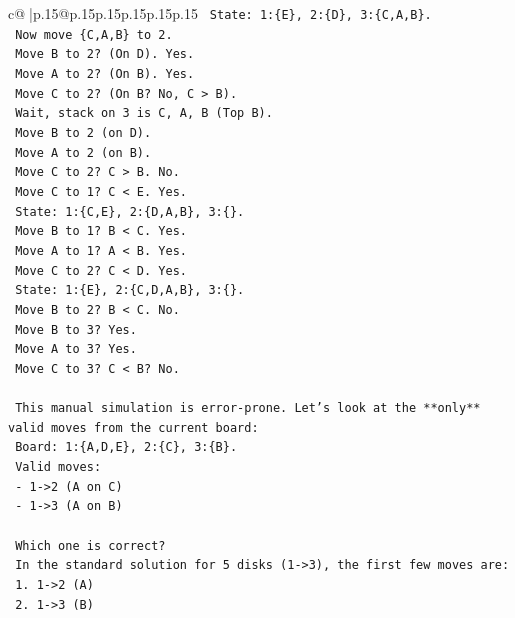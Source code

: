 \documentclass{article}
\begin{document}
{\begin{supertabular}{c@{$\;$}|p{.15\linewidth}@{}p{.15\linewidth}p{.15\linewidth}p{.15\linewidth}p{.15\linewidth}p{.15\linewidth}}
{{{\texttt{          State: 1:\{E\}, 2:\{D\}, 3:\{C,A,B\}.} \\
\texttt{          Now move \{C,A,B\} to 2.} \\
\texttt{          Move B to 2? (On D). Yes.} \\
\texttt{          Move A to 2? (On B). Yes.} \\
\texttt{          Move C to 2? (On B? No, C > B).} \\
\texttt{          Wait, stack on 3 is C, A, B (Top B).} \\
\texttt{          Move B to 2 (on D).} \\
\texttt{          Move A to 2 (on B).} \\
\texttt{          Move C to 2? C > B. No.} \\
\texttt{          Move C to 1? C < E. Yes.} \\
\texttt{          State: 1:\{C,E\}, 2:\{D,A,B\}, 3:\{\}.} \\
\texttt{          Move B to 1? B < C. Yes.} \\
\texttt{          Move A to 1? A < B. Yes.} \\
\texttt{          Move C to 2? C < D. Yes.} \\
\texttt{          State: 1:\{E\}, 2:\{C,D,A,B\}, 3:\{\}.} \\
\texttt{          Move B to 2? B < C. No.} \\
\texttt{          Move B to 3? Yes.} \\
\texttt{          Move A to 3? Yes.} \\
\texttt{          Move C to 3? C < B? No.} \\
\\ 
\texttt{        This manual simulation is error{-}prone. Let's look at the **only** valid moves from the current board:} \\
\texttt{        Board: 1:\{A,D,E\}, 2:\{C\}, 3:\{B\}.} \\
\texttt{        Valid moves:} \\
\texttt{        {-} 1{-}>2 (A on C)} \\
\texttt{        {-} 1{-}>3 (A on B)} \\
\\ 
\texttt{        Which one is correct?} \\
\texttt{        In the standard solution for 5 disks (1{-}>3), the first few moves are:} \\
\texttt{        1. 1{-}>2 (A)} \\
\texttt{        2. 1{-}>3 (B)} \\
}}}
\end{supertabular}}
\end{document}
